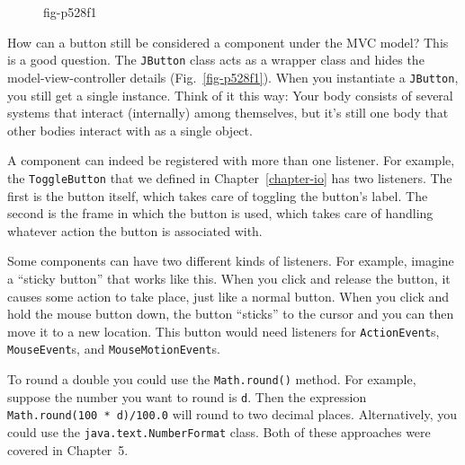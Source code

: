 \secANSH
\begin{ANS}

\begin{figure}[tb]
{fig-p528f1}

\end{figure}

\item  How can a button still be considered a component under the MVC model?
This is a good question. The {\tt JButton} class acts as a wrapper
class and hides the model-view-controller details
(Fig.~\ref{fig-p528f1}). When you instantiate a {\tt JButton}, you
still get a single instance.  Think of it this way: Your body consists
of several systems that interact (internally) among themselves, but
it's still one body that other bodies interact with as a single
object. 

\item  A component can indeed be registered with more than one listener.  For
example, the {\tt ToggleButton} that we defined in
Chapter~\ref{chapter-io} has two listeners. The first is the button
itself, which takes care of toggling the button's label. The second is the
frame in which the button is used, which takes care of handling
whatever action the button is associated with.

\item  Some components can have two different kinds of listeners.  For
example, imagine a ``sticky button'' that works like this. When you
click and release the button, it causes some action to take place,
just like a normal button. When you click and hold the mouse button
down, the button ``sticks'' to the cursor and you can then move it to
a new location. This button would need listeners for
{\tt ActionEvent}s, {\tt MouseEvent}s, and {\tt MouseMotionEvent}s.

\item  To round a double you could use the {\tt Math.round()} method.  For
example, suppose the number you want to round is {\tt d}. Then the
expression {\tt Math.round(100 * d)/100.0} will round to two
decimal places. Alternatively, you could use the
{\tt java.text.Num\-ber\-Format} class. Both of these approaches were covered
in Chapter~5.


\end{ANS}
